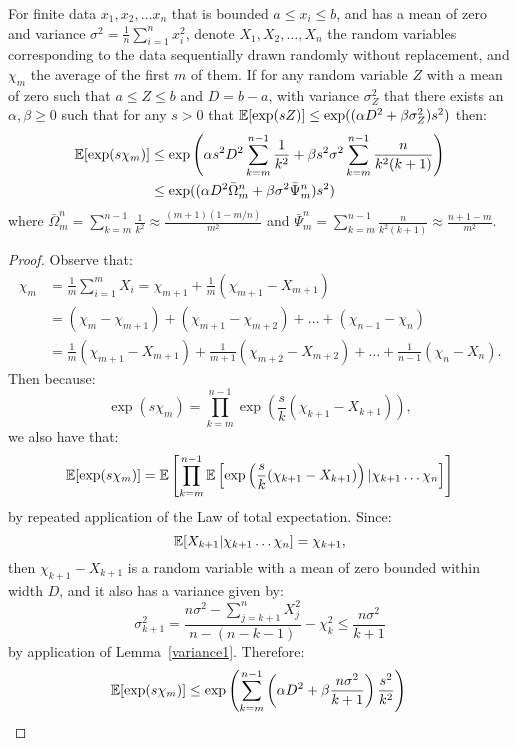 \begin{lemma}\label{martingale0}
For finite data $x_1,x_2,\dots x_n$ that is bounded $a\le x_i\le b$, and has a mean of zero and variance $\sigma^2=\frac{1}{n}\sum_{i=1}^nx_i^2$, denote $X_1,X_2,\dots,X_n$ the random variables corresponding to the data sequentially drawn randomly without replacement, and $\chi_m$ the average of the first $m$ of them.
If for any random variable $Z$ with a mean of zero such that $a\le Z\le b$ and $D=b-a$, with variance $\sigma_Z^2$ that there exists an $\alpha, \beta \ge 0$ such that for any $s>0$ that $\operatorname{\mathbb{E}}[\exp(sZ)]\le\exp((\alpha D^2 +\beta \sigma_Z^2) s^2)$ then:
\begin{align*}\operatorname{\mathbb{E}}[\exp(s\chi_m)]&\le\exp\left(\alpha s^2D^2\sum_{k=m}^{n-1}\frac{1}{k^2} +\beta s^2\sigma^2 \sum_{k=m}^{n-1}\frac{n}{k^2(k+1)}\right)\\ &\le \exp((\alpha D^2\bar{\Omega}_m^n +\beta\sigma^2 \bar{\Psi}_m^n)s^2)\end{align*}
where $\bar{\Omega}_m^n = \sum_{k=m}^{n-1}\frac{1}{k^2}\approx \frac{(m+1)(1-m/n)}{m^2}$ and $\bar{\Psi}_m^n = \sum_{k=m}^{n-1}\frac{n}{k^2(k+1)}\approx \frac{n+1-m}{m^2}$.
\end{lemma}
\begin{proof}
Observe that:
\begin{align*}
\chi_m 
& =\frac{1}{m}\sum_{i=1}^{m}X_i = \chi_{m+1}+\frac{1}{m}(\chi_{m+1}-X_{m+1})\\
& =(\chi_m-\chi_{m+1})+(\chi_{m+1}-\chi_{m+2}) + \dots + (\chi_{n-1}-\chi_n)\\
& =\frac{1}{m}(\chi_{m+1}-X_{m+1})+\frac{1}{m+1}(\chi_{m+2}-X_{m+2}) + \dots + \frac{1}{n-1}(\chi_n-X_n).
\end{align*} 
Then because:
$$\exp(s\chi_m)=\prod_{k=m}^{n-1}\exp\left(\frac{s}{k}(\chi_{k+1}-X_{k+1})\right),$$
we also have that: 
$$\operatorname{\mathbb{E}}[\exp(s\chi_m)]=\operatorname{\mathbb{E}}\left[\prod_{k=m}^{n-1}\operatorname{\mathbb{E}}\left[\exp\left(\frac{s}{k}(\chi_{k+1}-X_{k+1})\right)|\chi_{k+1}\dots \chi_n\right]\right]$$
by repeated application of the Law of total expectation. 
Since:
$$\operatorname{\mathbb{E}}[X_{k+1}|\chi_{k+1}\dots \chi_n]=\chi_{k+1},$$ 
then $\chi_{k+1}-X_{k+1}$ is a random variable with a mean of zero bounded within width $D$, and it also has a variance given by: 
\begin{equation}\label{approx1} 
\sigma_{k+1}^2 = \frac{n\sigma^2-\sum_{j=k+1}^nX_j^2}{n-(n-k-1)} - \chi_k^2 \le \frac{n\sigma^2}{k+1}
\end{equation}
by application of Lemma~\ref{variance1}. 
Therefore: 
\[\operatorname{\mathbb{E}}[\exp(s\chi_m)]\le\exp\left(\sum_{k=m}^{n-1}\left(\alpha D^2 +\beta \frac{n\sigma^2}{k+1}\right) \frac{s^2}{k^2}\right)\qedhere\]
\end{proof}


